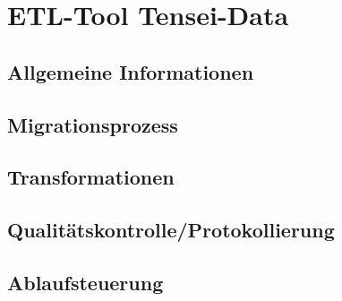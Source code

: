 
\chapter{ETL-Tool Tensei-Data}
\section{Allgemeine Informationen}
\section{Migrationsprozess}
\section{Transformationen}
\section{Qualitätskontrolle/Protokollierung}
\section{Ablaufsteuerung}
